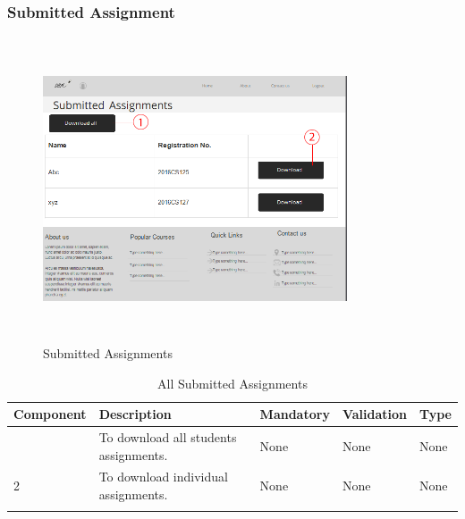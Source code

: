 \documentclass[12pt]{article}
\begin{document}
\subsubsection{Submitted Assignment}
\begin{figure}[H]
  \centering
  \includegraphics[width=9cm, height=9cm]{SubmittedAssignments}
  \caption{Submitted Assignments}
\end{figure}

\newpage
\begin{longtable}{|>{\raggedright\arraybackslash}p{2.5cm}|>{\raggedright\arraybackslash}p{4cm}|>{\raggedright\arraybackslash}p{2.2cm}|>{\raggedright\arraybackslash}p{2cm}|>{\raggedright\arraybackslash}p{2cm}|}
\hline
\textbf{Component} & \textbf{Description} & \textbf{Mandatory} & \textbf{Validation} & \textbf{Type}\\
\hline
1 &
To download all students assignments. &
None &
None &
None \\
\hline

2 &
To download individual assignments. &
None &
None &
None \\
\hline


\caption{All Submitted Assignments}
\end{longtable}
\end{document}
